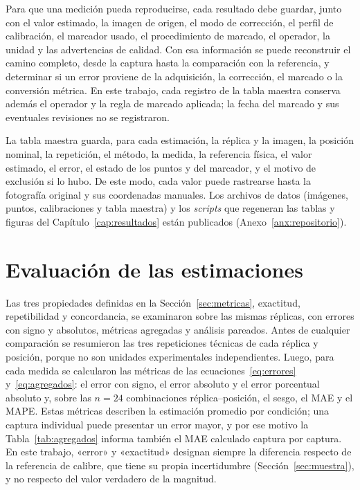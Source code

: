 Para que una medición pueda reproducirse, cada resultado debe guardar, junto con el valor estimado, la imagen de origen, el modo de corrección, el perfil de calibración, el marcador usado, el procedimiento de marcado, el operador, la unidad y las advertencias de calidad. Con esa información se puede reconstruir el camino completo, desde la captura hasta la comparación con la referencia, y determinar si un error proviene de la adquisición, la corrección, el marcado o la conversión métrica. En este trabajo, cada registro de la tabla maestra conserva además el operador y la regla de marcado aplicada; la fecha del marcado y sus eventuales revisiones no se registraron.

La tabla maestra guarda, para cada estimación, la réplica y la imagen, la posición nominal, la repetición, el método, la medida, la referencia física, el valor estimado, el error, el estado de los puntos y del marcador, y el motivo de exclusión si lo hubo. De este modo, cada valor puede rastrearse hasta la fotografía original y sus coordenadas manuales. Los archivos de datos (imágenes, puntos, calibraciones y tabla maestra) y los \emph{scripts} que regeneran las tablas y figuras del Capítulo~\ref{cap:resultados} están publicados (Anexo~\ref{anx:repositorio}).

\section{Evaluación de las estimaciones}
\label{sec:evaluacion}

Las tres propiedades definidas en la Sección~\ref{sec:metricas}, exactitud, repetibilidad y concordancia, se examinaron sobre las mismas réplicas, con errores con signo y absolutos, métricas agregadas y análisis pareados. Antes de cualquier comparación se resumieron las tres repeticiones técnicas de cada réplica y posición, porque no son unidades experimentales independientes. Luego, para cada medida se calcularon las métricas de las ecuaciones~\eqref{eq:errores} y~\eqref{eq:agregados}: el error con signo, el error absoluto y el error porcentual absoluto y, sobre las $n = 24$ combinaciones réplica--posición, el sesgo, el MAE y el MAPE. Estas métricas describen la estimación promedio por condición; una captura individual puede presentar un error mayor, y por ese motivo la Tabla~\ref{tab:agregados} informa también el MAE calculado captura por captura. En este trabajo, «error» y «exactitud» designan siempre la diferencia respecto de la referencia de calibre, que tiene su propia incertidumbre (Sección~\ref{sec:muestra}), y no respecto del valor verdadero de la magnitud.

